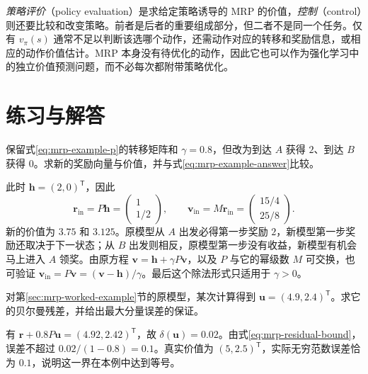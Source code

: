 \documentclass[UTF8,12pt,a4paper,fontset=fandol]{ctexart}
\begin{document}
\emph{策略评价}（policy evaluation）是求给定策略诱导的 MRP 的价值，\emph{控制}（control）则还要比较和改变策略。前者是后者的重要组成部分，但二者不是同一个任务。仅有 $v_\pi(s)$ 通常不足以判断该选哪个动作，还需动作对应的转移和奖励信息，或相应的动作价值估计。MRP 本身没有待优化的动作，因此它也可以作为强化学习中的独立价值预测问题，而不必每次都附带策略优化。

\section{练习与解答}
\label{sec:mrp-exercises}

\begin{example}[同一组数字换一种奖励时序]
\label{ex:mrp-exercise-arrival}
保留式\eqref{eq:mrp-example-p}的转移矩阵和 $\gamma=0.8$，但改为到达 $A$ 获得 $2$、到达 $B$ 获得 $0$。求新的奖励向量与价值，并与式\eqref{eq:mrp-example-answer}比较。
\end{example}
\begin{solve}
此时 $\boldsymbol h=(2,0)^{\mathsf T}$，因此
\[
  \boldsymbol r_{\mathrm{in}}=P\boldsymbol h
    =\begin{pmatrix}1\\1/2\end{pmatrix},\qquad
  \boldsymbol v_{\mathrm{in}}=M\boldsymbol r_{\mathrm{in}}
    =\begin{pmatrix}15/4\\25/8\end{pmatrix}.
\]
新的价值为 $3.75$ 和 $3.125$。原模型从 $A$ 出发必得第一步奖励 $2$，新模型第一步奖励还取决于下一状态；从 $B$ 出发则相反，原模型第一步没有收益，新模型有机会马上进入 $A$ 领奖。由原方程 $\boldsymbol v=\boldsymbol h+\gamma P\boldsymbol v$，以及 $P$ 与它的幂级数 $M$ 可交换，也可验证 $\boldsymbol v_{\mathrm{in}}=P\boldsymbol v=(\boldsymbol v-\boldsymbol h)/\gamma$。最后这个除法形式只适用于 $\gamma>0$。
\end{solve}

\begin{example}[用残差判断计算是否足够准确]
对第\ref{sec:mrp-worked-example}节的原模型，某次计算得到 $\boldsymbol u=(4.9,2.4)^{\mathsf T}$。求它的贝尔曼残差，并给出最大分量误差的保证。
\end{example}
\begin{solve}
有 $\boldsymbol r+0.8P\boldsymbol u=(4.92,2.42)^{\mathsf T}$，故 $\delta(\boldsymbol u)=0.02$。由式\eqref{eq:mrp-residual-bound}，误差不超过 $0.02/(1-0.8)=0.1$。真实价值为 $(5,2.5)^{\mathsf T}$，实际无穷范数误差恰为 $0.1$，说明这一界在本例中达到等号。
\end{solve}
\end{document}
